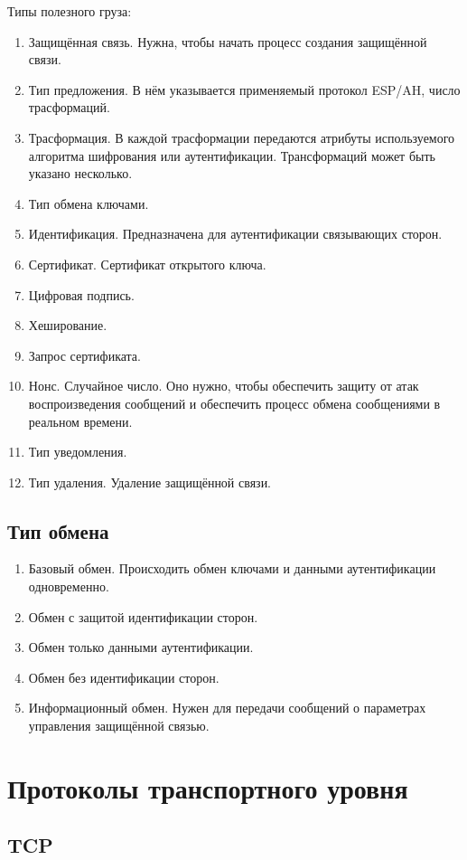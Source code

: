 \documentclass[12pt, russian, oneside, article]{ncc}
\begin{document}
Типы полезного груза:
\begin{enumerate}
\item Защищённая связь. Нужна, чтобы начать процесс создания защищённой связи.
\item Тип предложения. В нём указывается применяемый протокол ESP/AH, число трасформаций.
\item Трасформация. В каждой трасформации передаются атрибуты используемого алгоритма шифрования или аутентификации. Трансформаций может быть указано несколько.
\item Тип обмена ключами.
\item Идентификация. Предназначена для аутентификации связывающих сторон.
\item Сертификат. Сертификат открытого ключа.
\item Цифровая подпись.
\item Хеширование.
\item Запрос сертификата.
\item Нонс. Случайное число. Оно нужно, чтобы обеспечить защиту от атак воспроизведения сообщений и обеспечить процесс обмена сообщениями в реальном времени.
\item Тип уведомления.
\item Тип удаления. Удаление защищённой связи.
\end{enumerate}
\subsection{Тип обмена}
\label{sec-4_5}


\begin{enumerate}
\item Базовый обмен. Происходить обмен ключами и данными аутентификации одновременно.
\item Обмен с защитой идентификации сторон.
\item Обмен только данными аутентификации.
\item Обмен без идентификации сторон.
\item Информационный обмен. Нужен для передачи сообщений о параметрах управления защищённой связью.
\end{enumerate}
\section{Протоколы транспортного уровня}
\label{sec-5}
\subsection{TCP}
\label{sec-5_1}
\end{document}
